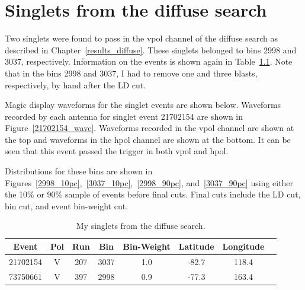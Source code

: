 \chapter{Singlets from the diffuse search}

Two singlets were found to pass in the \gls{vpol} channel of the diffuse search as described in Chapter~\ref{results_diffuse}. These singlets belonged to bins 2998 and 3037, respectively. Information on the events is shown again in Table~\ref{vpol_singlets}. Note that in the bins 2998 and 3037, I had to remove one and three blasts, respectively, by hand after the LD cut. 

Magic display waveforms for the singlet events are shown below. 
Waveforms recorded by each antenna for singlet event 21702154 are shown in Figure~\ref{21702154_wave}. Waveforms recorded in the \gls{vpol} channel are shown at the top and waveforms in the \gls{hpol} channel are shown at the bottom. It can be seen that this event passed the trigger in both \gls{vpol} and \gls{hpol}. 

Distributions for these bins are shown in Figures~\ref{2998_10pc},~\ref{3037_10pc},~\ref{2998_90pc}, and~\ref{3037_90pc} using either the 10\% or 90\% sample of events before final cuts. Final cuts include the LD cut, bin cut, and event bin-weight cut. 

\begin{table}
\centering
\begin{tabular}{ |c|c|c|c|c|c|c|c| } 
\hline
Event & Pol & Run & Bin & Bin-Weight & Latitude & Longitude\\
\hline
21702154 & V & 207 & 3037 & 1.0 & -82.7 & 118.4\\
73750661 & V & 397 & 2998 & 0.9 & -77.3 & 163.4\\
\hline
\end{tabular}
\caption{My singlets from the diffuse search.}
\label{vpol_singlets}
\end{table}



